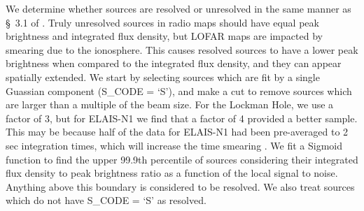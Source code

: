 \documentclass[usenatbib,fleqn,letters]{mnras}
\begin{document}
We determine whether sources are resolved or unresolved in the same manner as \S~3.1 of \cite{shimwell_lofar_2019,shimwell_lofar_2022}. Truly unresolved sources in radio maps should have equal peak brightness and integrated flux density, but LOFAR maps are impacted by smearing due to the ionosphere. This causes resolved sources to have a lower peak brightness when compared to the integrated flux density, and they can appear spatially extended. We start by selecting sources which are fit by a single Guassian component ({\ttfamily S\_CODE = `S'}), and make a cut to remove sources which are larger than a multiple of the beam size. For the Lockman Hole, we use a factor of 3, but for ELAIS-N1 we find that a factor of 4 provided a better sample. This may be because half of the data for ELAIS-N1 had been pre-averaged to 2 sec integration times, which will increase the time smearing \citep[see \S~2 in][]{de_jong_into_2024}. We fit a Sigmoid function to find the upper 99.9th percentile of sources considering their integrated flux density to peak brightness ratio as a function of the local signal to noise. Anything above this boundary is considered to be resolved. We also treat sources which do not have {\ttfamily S\_CODE = `S'} as resolved.
\end{document}
